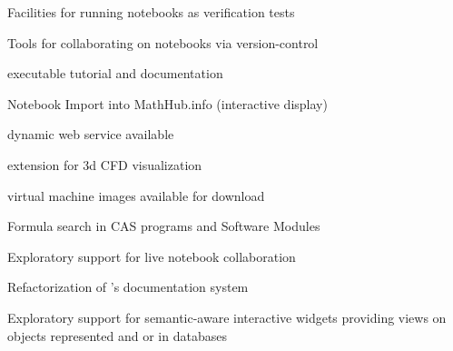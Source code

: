 \begin{workpackage}
\begin{wpdelivs}
  \begin{wpdeliv}[due=18,id=jupyter-test,dissem=PU,nature=O]
      {Facilities for running notebooks as verification tests}
  \end{wpdeliv}

  \begin{wpdeliv}[due=12,id=jupyter-collab,dissem=PU,nature=O]
      {Tools for collaborating on notebooks via version-control}
  \end{wpdeliv}
    \begin{wpdeliv}[due=21,id=oommf-nb-documentation,dissem=PU,nature=DEC]
      {\OOMMFNB{} executable tutorial and documentation}
    \end{wpdeliv}
    \begin{wpdeliv}[id=jupyter-import,due=24,nature=DEM,dissem=PU]
      {Notebook Import into MathHub.info (interactive display)}
    \end{wpdeliv}
    \begin{wpdeliv}[due=24,id=oommf-nb-tmp,dissem=PU,nature=DEC]
      {\OOMMFNB{} dynamic web service available}
    \end{wpdeliv}

  \begin{wpdeliv}[due=24,id=cfd-vis,dissem=PU,nature=O]
      {\Jupyter extension for 3d CFD visualization}
  \end{wpdeliv}

    \begin{wpdeliv}[due=24,id=oommf-nb-virtual,dissem=PU,nature=O]
      {\OOMMFNB{} virtual machine images available for download}
    \end{wpdeliv}

    \begin{wpdeliv}[id=cassearch,due=30,nature=O,dissem=PU]
      {Formula search in CAS programs and Software Modules}
    \end{wpdeliv}

  \begin{wpdeliv}[due=36,id=jupyter-live-collab,dissem=PU,nature=O]
      {Exploratory support for live notebook collaboration}
  \end{wpdeliv}

  \begin{wpdeliv}[due=24,id=sage-sphinx,dissem=PU,nature=O]
      {Refactorization of \Sage's \Sphinx documentation system}
  \end{wpdeliv}

  \begin{wpdeliv}[due=36,id=ipython-advanced-interacts,dissem=PU,nature=DEM]
      {Exploratory support for semantic-aware interactive widgets providing views on objects
      represented and or in databases}
  \end{wpdeliv}


\end{wpdelivs}
\end{workpackage}
